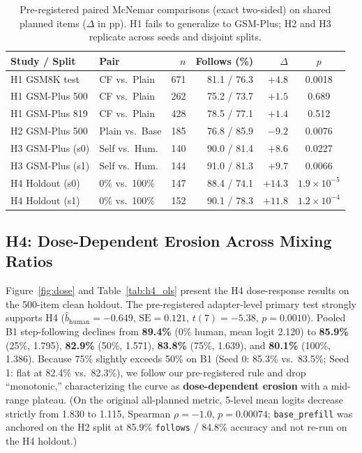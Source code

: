 \documentclass[11pt]{article}
\begin{document}
\begin{table}[t]
\centering
\scriptsize
\setlength{\tabcolsep}{2.0pt}
\begin{tabular}{@{}llrrrc@{}}
\toprule
\textbf{Study / Split} & \textbf{Pair} & $n$ & \textbf{Follows (\%)} & $\Delta$ & $p$ \\
\midrule
H1 GSM8K test & CF vs.\ Plain & 671 & 81.1 / 76.3 & $+4.8$ & 0.0018 \\
H1 GSM-Plus 500 & CF vs.\ Plain & 262 & 75.2 / 73.7 & $+1.5$ & 0.689 \\
H1 GSM-Plus 819 & CF vs.\ Plain & 428 & 78.5 / 77.1 & $+1.4$ & 0.512 \\
H2 GSM-Plus 500 & Plain vs.\ Base & 185 & 76.8 / 85.9 & $-9.2$ & 0.0076 \\
\midrule
H3 GSM-Plus (s0) & Self vs.\ Hum. & 140 & 90.0 / 81.4 & $+8.6$ & 0.0227 \\
H3 GSM-Plus (s1) & Self vs.\ Hum. & 144 & 91.0 / 81.3 & $+9.7$ & 0.0066 \\
H4 Holdout (s0) & 0\% vs.\ 100\% & 147 & 88.4 / 74.1 & $+14.3$ & $1.9\times 10^{-5}$ \\
H4 Holdout (s1) & 0\% vs.\ 100\% & 152 & 90.1 / 78.3 & $+11.8$ & $1.2\times 10^{-4}$ \\
\bottomrule
\end{tabular}
\caption{Pre-registered paired McNemar comparisons (exact two-sided) on shared planned items ($\Delta$ in pp). H1 fails to generalize to GSM-Plus; H2 and H3 replicate across seeds and disjoint splits.}
\label{tab:h1_h3}
\end{table}

\subsection{H4: Dose-Dependent Erosion Across Mixing Ratios}

Figure~\ref{fig:dose} and Table~\ref{tab:h4_ols} present the H4 dose-response results on the 500-item clean holdout.
The pre-registered adapter-level primary test strongly supports H4 ($\hat b_{\text{human}} = -0.649$, $\text{SE}=0.121$, $t(7)=-5.38$, $p=0.0010$).
Pooled B1 step-following declines from \textbf{89.4\%} (0\% human, mean logit 2.120) to \textbf{85.9\%} (25\%, 1.795), \textbf{82.9\%} (50\%, 1.571), \textbf{83.8\%} (75\%, 1.639), and \textbf{80.1\%} (100\%, 1.386).
Because 75\% slightly exceeds 50\% on B1 (Seed 0: 85.3\% vs.\ 83.5\%; Seed 1: flat at 82.4\% vs.\ 82.3\%), we follow our pre-registered rule and drop ``monotonic,'' characterizing the curve as \textbf{dose-dependent erosion} with a mid-range plateau.
(On the original all-planned metric, 5-level mean logits decrease strictly from 1.830 to 1.115, Spearman $\rho = -1.0$, $p = 0.00074$; \texttt{base\_prefill} was anchored on the H2 split at 85.9\% \texttt{follows} / 84.8\% accuracy and not re-run on the H4 holdout.)
\end{document}
